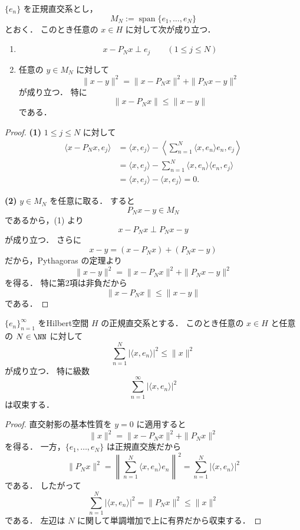 \begin{theorem}[直交射影の基本性質]
$\{e_n\}$ を正規直交系とし，
\[
M_N:=\operatorname{span}\{e_1,\dots,e_N\}
\]
とおく．
このとき任意の $x\in H$ に対して次が成り立つ．
\begin{enumerate}
    \item
    \[
    x-P_Nx \perp e_j
    \qquad (1\le j\le N)
    \]
    \item 任意の $y\in M_N$ に対して
    \[
    \|x-y\|^2
    =
    \|x-P_Nx\|^2
    +
    \|P_Nx-y\|^2
    \]
    が成り立つ．
    特に
    \[
    \|x-P_Nx\|\le \|x-y\|
    \]
    である．
\end{enumerate}
\end{theorem}
\begin{proof}
\textbf{(1)}\quad
$1\le j\le N$ に対して
\begin{align*}
\langle x-P_Nx,e_j\rangle
&=
\langle x,e_j\rangle
-
\left\langle \sum_{n=1}^N \langle x,e_n\rangle e_n,e_j\right\rangle \\
&=
\langle x,e_j\rangle
-
\sum_{n=1}^N \langle x,e_n\rangle \langle e_n,e_j\rangle \\
&=
\langle x,e_j\rangle-\langle x,e_j\rangle
=0.
\end{align*}

\textbf{(2)}\quad
$y\in M_N$ を任意に取る．
すると
\[
P_Nx-y\in M_N
\]
であるから，(1) より
\[
x-P_Nx \perp P_Nx-y
\]
が成り立つ．
さらに
\[
x-y=(x-P_Nx)+(P_Nx-y)
\]
だから，Pythagoras の定理より
\[
\|x-y\|^2
=
\|x-P_Nx\|^2+\|P_Nx-y\|^2
\]
を得る．
特に第2項は非負だから
\[
\|x-P_Nx\|\le \|x-y\|
\]
である．
\end{proof}

\begin{corollary}[Besselの不等式]
$\{e_n\}_{n=1}^{\infty}$ をHilbert空間 $H$ の正規直交系とする．
このとき任意の $x\in H$ と任意の $N\in\NN$ に対して
\[
\sum_{n=1}^N |\langle x,e_n\rangle|^2\le \|x\|^2
\]
が成り立つ．
特に級数
\[
\sum_{n=1}^{\infty} |\langle x,e_n\rangle|^2
\]
は収束する．
\end{corollary}
\begin{proof}
直交射影の基本性質を $y=0$ に適用すると
\[
\|x\|^2=\|x-P_Nx\|^2+\|P_Nx\|^2
\]
を得る．
一方，$\{e_1,\dots,e_N\}$ は正規直交族だから
\[
\|P_Nx\|^2
=
\left\|
\sum_{n=1}^N \langle x,e_n\rangle e_n
\right\|^2
=
\sum_{n=1}^N |\langle x,e_n\rangle|^2
\]
である．
したがって
\[
\sum_{n=1}^N |\langle x,e_n\rangle|^2
=
\|P_Nx\|^2
\le
\|x\|^2
\]
である．
左辺は $N$ に関して単調増加で上に有界だから収束する．
\end{proof}

